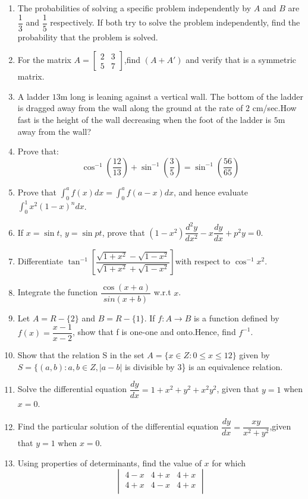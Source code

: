\documentclass[12pt,-letter paper]{exam}
\begin{document}
{\begin{enumerate}
\item The probabilities of solving a specific problem independently by $A$ and $B$ are $\dfrac{1}{3}$ and $\dfrac{1}{5}$ respectively. If both try to solve the problem independently, find the probability that the problem is solved.
\item For the matrix $A=\begin{bmatrix}2 & 3\\5 & 7\end{bmatrix}$,find $(A+A')$ and verify that is a symmetric matrix.
\item A ladder $13$m long is leaning against a vertical wall. The bottom of the ladder is dragged away from the wall along the ground at the rate of $2$ cm/sec.How fast is the height of the wall decreasing when the foot of the ladder is $5$m away from the wall?
\item Prove that:\[\cos^{-1}(\dfrac{12}{13})+\sin^{-1}(\dfrac{3}{5}) = \sin^{-1}(\dfrac{56}{65})\]
\item Prove that $\int_{0}^{a} f(x) dx = \int_{0}^{a} f(a-x) dx$, and hence evaluate $\int_{0}^{1} x^2(1-x)^n dx$.
\item If $x=\sin t$, $ y=\sin pt$, prove that $(1-x^2)\dfrac{d^2 y}{d x^2}-x\dfrac{dy}{dx}+p^2 y=0$.
\item Differentiate $\tan^{-1}[\dfrac{\sqrt{1+x^2}-\sqrt{1-x^2}}{\sqrt{1+x^2}+\sqrt{1-x^2}}] $with respect to $\cos^{-1} x^2$.
\item Integrate the function $\dfrac{\cos (x+a)}{sin (x+b)}$ w.r.t $x$.
\item Let $A=R-\{2\}$ and $B=R-\{1\}$. If $f:A \rightarrow B$ is a function defined by $f(x)=\dfrac{x-1}{x-2}$, show that f is one-one and onto.Hence, find $f^{-1}$.
\item Show that the relation S in the  set $ A=\{ x \in Z : 0 \leq x \leq 12\} $ given by $ S = \{(a,b) :a,b \in Z,|a-b|$ is divisible by $3$\}  is an equivalence relation.
\item Solve the differential equation $\dfrac{dy}{dx} = 1+x^{2}+ y^{2}+x^{2}y^{2}$, given that $y=1$ when $x=0$.
\item Find the particular solution of the differential equation $\dfrac{dy}{dx}=\dfrac{xy}{x^{2}+y^{2}}$,given that $y=1$ when $x=0$.
\item Using properties of determinants, find the value of $x$ for which
	\[\begin{vmatrix}
		4-x & 4+x & 4+x\\
		4+x & 4-x & 4+x\\

\end{vmatrix}\]
\end{enumerate}}
\end{document}
